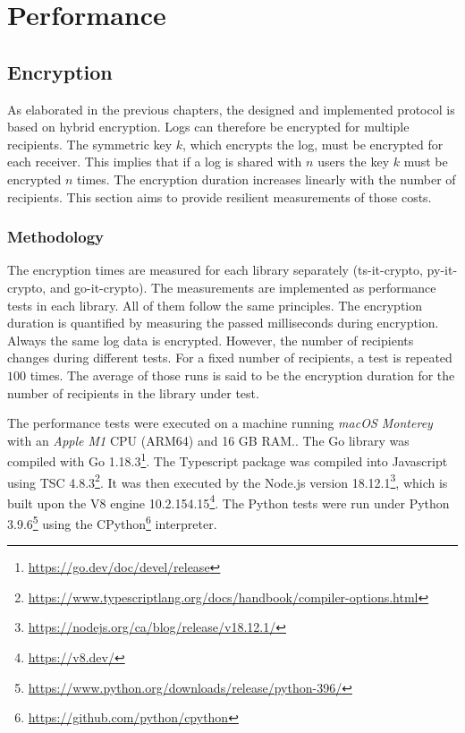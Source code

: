 \documentclass[../main.tex]{subfiles}
\begin{document}
\section{Performance}
\label{sec:evaluation-perf}

\subsection{Encryption}
As elaborated in the previous chapters, the designed and implemented protocol is based on hybrid encryption.
Logs can therefore  be encrypted for multiple recipients.
The symmetric key $k$, which encrypts the log, must be encrypted for each receiver.
This implies that if a log is shared with $n$ users the key $k$ must be encrypted $n$ times.
The encryption duration increases linearly with the number of recipients.
This section aims to provide resilient measurements of those costs.

\subsubsection{Methodology}
The encryption times are measured for each library separately (ts-it-crypto, py-it-crypto, and go-it-crypto).
The measurements are implemented as performance tests in each library.
All of them follow the same principles.
The encryption duration is quantified by measuring the passed milliseconds during encryption.
Always the same log data is encrypted.
However, the number of recipients changes during different tests.
For a fixed number of recipients, a test is repeated $100$ times.
The average of those runs is said to be the encryption duration for the number of recipients in the library under test.

The performance tests were executed on a machine running \emph{macOS Monterey} with an \emph{Apple M1} CPU (ARM64) and 16 GB RAM..
The Go library was compiled with Go 1.18.3\footnote{\url{https://go.dev/doc/devel/release}}.
The Typescript package was compiled into Javascript using TSC 4.8.3\footnote{\url{https://www.typescriptlang.org/docs/handbook/compiler-options.html}}. 
It was then executed by the Node.js version 18.12.1\footnote{\url{https://nodejs.org/ca/blog/release/v18.12.1/}}, which is built upon the V8 engine 10.2.154.15\footnote{\url{https://v8.dev/}}.
The Python tests were run under Python 3.9.6\footnote{\url{https://www.python.org/downloads/release/python-396/}} using the CPython\footnote{\url{https://github.com/python/cpython}} interpreter.
\end{document}
